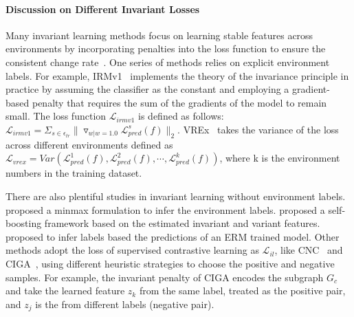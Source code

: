 \paragraph{Discussion on Different Invariant Losses}
Many invariant learning methods focus on learning stable features across environments by incorporating penalties into the loss function to ensure the consistent change rate~\citep{irmv1,v-rex, fishr, cnc}.
One series of methods relies on explicit environment labels.
For example, IRMv1~\citep{irmv1} implements the theory of the invariance principle in practice by assuming the classifier as the constant and employing a gradient-based penalty that requires the sum of the gradients of the model to remain small.
The loss function $\mathcal{L}_{irmv1}$ is defined as follows:
\(\mathcal{L}_{irmv1}= \Sigma_{s \in \epsilon_{tr}} \| \triangledown_{w | w=1.0} \mathcal{L}_{pred}^s(f)\|_2\).
VREx~\citep{v-rex} takes the variance of the loss across different environments defined as
\(\mathcal{L}_{vrex}= Var(\mathcal{L}_{pred}^1(f),\mathcal{L}_{pred}^2(f),\cdots,\mathcal{L}_{pred}^k(f))\),
where k is the environment numbers in the training dataset.

There are also plentiful studies in invariant learning without environment labels.
\citet{eiil} proposed a minmax formulation to infer the environment labels.
\citet{hrm} proposed a self-boosting framework based on the estimated invariant and variant features.
\citet{jtt,cnc} proposed to infer labels based the predictions of an ERM trained model.
 Other methods adopt the loss of supervised contrastive learning as $\mathcal{L}_{il}$, like CNC~\cite{cnc} and CIGA~\cite{ciga}, using different heuristic strategies to choose the positive and negative samples.
 For example, the invariant penalty of CIGA encodes the subgraph $G_c$ and take the learned feature $z_k$ from the same label, treated as the positive pair, and $z_j$ is the from different labels (negative pair).
